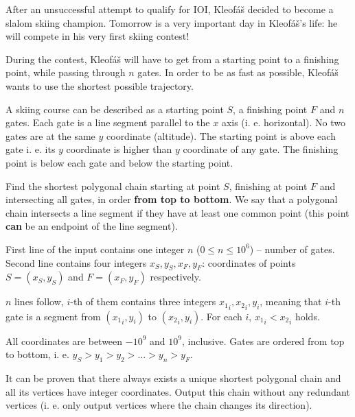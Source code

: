 





After an unsuccessful attempt to qualify for IOI, Kleofáš decided to become
a slalom skiing champion. Tomorrow is a very important day in Kleofáš's life:
he will compete in his very first skiing contest!

During the contest, Kleofáš will have to get from a starting point to a finishing point,
while passing through $n$ gates. In order to be as fast as possible, Kleofáš wants
to use the shortest possible trajectory.


A skiing course can be described as a starting point $S$, a finishing point $F$ and $n$ 
gates. Each gate is a line segment parallel to the $x$ axis (i. e. horizontal). No two
gates are at the same $y$ coordinate (altitude). The starting point is above each gate
i. e. its $y$ coordinate is higher than $y$ coordinate of any gate. The finishing point
is below each gate and below the starting point.

Find the shortest polygonal chain starting at point $S$, finishing at point $F$ and intersecting
all gates, in order \textbf{from top to bottom}. We say that a polygonal chain intersects a line
segment if they have at least one common point (this point \textbf{can} be an endpoint of the line segment).


First line of the input contains one integer $n$ ($0 \leq n \leq 10^6$) -- number of gates.
Second line contains four integers $x_S, y_S, x_F, y_F$: coordinates of points $S = (x_S, y_S)$
and $F = (x_F, y_F)$ respectively.

$n$ lines follow, $i$-th of them contains three integers ${x_1}_i, {x_2}_i, {y}_i$, meaning that
$i$-th gate is a segment from $({x_1}_i, y_i)$ to $({x_2}_i, y_i)$. For each $i$, 
${x_1}_i < {x_2}_i$ holds.

All coordinates are between $-10^9$ and $10^9$, inclusive. Gates are ordered from top to bottom,
i. e. $y_S > y_1 > y_2 > \dots > y_n > y_F$.


It can be proven that there always exists a unique shortest polygonal chain and all its vertices have integer coordinates. Output this chain without any redundant vertices (i. e. only output vertices
where the chain changes its direction).

